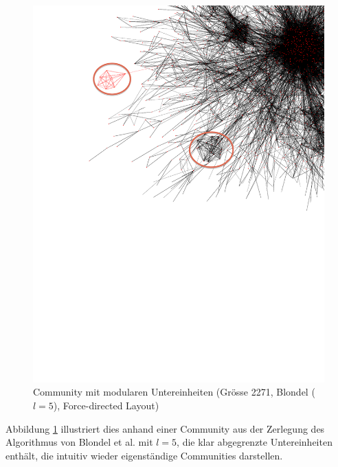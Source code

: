 \begin{figure}[ht!]
  \centering
  \includegraphics[scale=0.7]{images/blondel-l5-com-c3a5eaab680984b123037897b0be74bf-edit.pdf}
  \caption{Community mit modularen Untereinheiten (Gr\"osse 2271,
    Blondel ($l=5$), Force-directed Layout)}
  \label{fig:large-modular}
\end{figure}

Abbildung \ref{fig:large-modular} illustriert dies anhand einer
Community aus der Zerlegung des Algorithmus von Blondel et al. mit
$l=5$, die klar abgegrenzte Untereinheiten enth\"alt, die intuitiv
wieder eigenst\"andige Communities darstellen.

